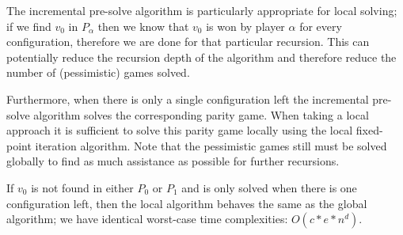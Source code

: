 The incremental pre-solve algorithm is particularly appropriate for local solving; if we find ${v}_0$ in  $P_\alpha$ then we know that ${v}_0$ is won by player $\alpha$ for every configuration, therefore we are done for that particular recursion. This can potentially reduce the recursion depth of the algorithm and therefore reduce the number of (pessimistic) games solved.

Furthermore, when there is only a single configuration left the incremental pre-solve algorithm solves the corresponding parity game. When taking a local approach it is sufficient to solve this parity game locally using the local fixed-point iteration algorithm. Note that the pessimistic games still must be solved globally to find as much assistance as possible for further recursions.

If $v_0$ is not found in either $P_0$ or $P_1$ and is only solved when there is one configuration left, then the local algorithm behaves the same as the global algorithm; we have identical worst-case time complexities: $O(c*e*n^d)$.